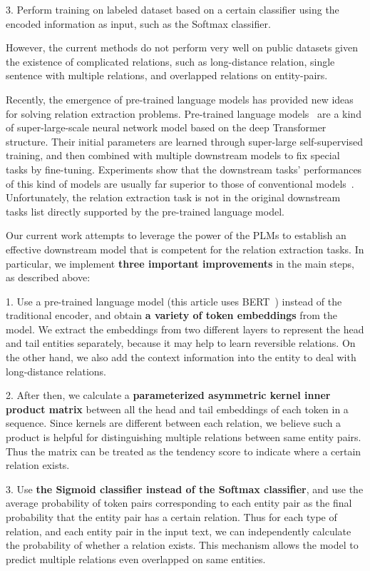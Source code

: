 \documentclass[11pt,a4paper]{article}
\begin{document}
3. Perform training on labeled dataset based on a certain classifier using the encoded information as input, such as the Softmax classifier. 


However, the current methods do not perform very well on public datasets given the existence of complicated relations, such as long-distance relation, single sentence with multiple relations, and overlapped relations on entity-pairs.


Recently, the emergence of pre-trained language models has provided new ideas for solving relation extraction problems. Pre-trained language models~\cite{devlin2018bert,radford2019language,yang2019xlnet,raffel2019exploring} are a kind of super-large-scale neural network model based on the deep Transformer~\cite{vaswani2017attention} structure. Their initial parameters are learned through super-large self-supervised training, and then combined with multiple downstream models to fix special tasks by fine-tuning. Experiments show that the downstream tasks' performances of this kind of models are usually far superior to those of conventional models~\cite{liu2019roberta}. Unfortunately, the relation extraction task is not in the original downstream tasks list directly supported by the pre-trained language model.

Our current work attempts to leverage the power of the PLMs to establish an effective downstream model that is competent for the relation extraction tasks. In particular, we implement \textbf{three important improvements} in the main steps, as described above:

1. Use a pre-trained language model (this article uses BERT~\cite{devlin2018bert}) instead of the traditional encoder, and obtain \textbf{a variety of token embeddings} from the model. We extract the embeddings from two different layers to represent the head and tail entities separately, because it may help to learn reversible relations. On the other hand, we also add the context information into the entity to deal with long-distance relations.

2. After then, we calculate a \textbf{parameterized asymmetric kernel inner product matrix} between all the head and tail embeddings of each token in a sequence. Since kernels are different between each relation, we believe such a product is helpful for distinguishing multiple relations between same entity pairs. Thus the matrix can be treated as the tendency score to indicate where a certain relation exists.

3. Use \textbf{the Sigmoid classifier instead of the Softmax classifier}, and use the average probability of token pairs corresponding to each entity pair as the final probability that the entity pair has a certain relation. Thus for each type of relation, and each entity pair in the input text, we can independently calculate the probability of whether a relation exists. This mechanism allows the model to predict multiple relations even overlapped on same entities.
\end{document}
